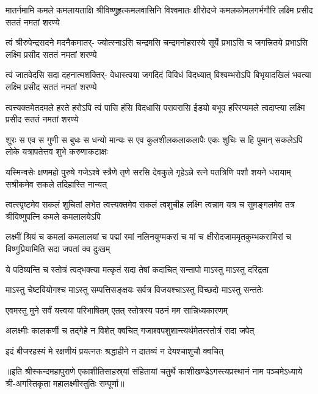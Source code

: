 


\fourlineindentedshloka
{मातर्नमामि कमले कमलायताक्षि}
{श्रीविष्णुहृत्कमलवासिनि विश्वमातः}
{क्षीरोदजे कमलकोमलगर्भगौरि}
{लक्ष्मि प्रसीद सततं नमतां शरण्ये}%

\fourlineindentedshloka
{त्वं श्रीरुपेन्द्रसदने मदनैकमातर्-}
{ज्योत्स्नाऽसि चन्द्रमसि चन्द्रमनोहरास्ये}
{सूर्ये प्रभाऽसि च जगत्त्रितये प्रभाऽसि}
{लक्ष्मि प्रसीद सततं नमतां शरण्ये}%


\fourlineindentedshloka
{त्वं जातवेदसि सदा दहनात्मशक्तिर्-}
{वेधास्त्वया जगदिदं विविधं विदध्यात्}
{विश्वम्भरोऽपि बिभृयादखिलं भवत्या}
{लक्ष्मि प्रसीद सततं नमतां शरण्ये}%

\fourlineindentedshloka
{त्वत्त्यक्तमेतदमले हरते हरोऽपि}
{त्वं पासि हंसि विदधासि परावरासि}
{ईड्यो बभूव हरिरप्यमले त्वदाप्त्या}
{लक्ष्मि प्रसीद सततं नमतां शरण्ये}%

\fourlineindentedshloka
{शूरः स एव स गुणी स बुधः स धन्यो}
{मान्यः स एव कुलशीलकलाकलापैः}
{एकः शुचिः स हि पुमान् सकलेऽपि लोके}
{यत्रापतेत्तव शुभे करुणाकटाक्षः}%

\fourlineindentedshloka
{यस्मिन्वसेः क्षणमहो पुरुषे गजेऽश्वे}
{स्त्रैणे तृणे सरसि देवकुले गृहेऽन्ने}
{रत्ने पतत्रिणि पशौ शयने धरायाम्}
{सश्रीकमेव सकले तदिहास्ति नान्यत्}%

\fourlineindentedshloka
{त्वत्स्पृष्टमेव सकलं शुचितां लभेत}
{त्वत्त्यक्तमेव सकलं त्वशुचीह लक्ष्मि}
{त्वन्नाम यत्र च सुमङ्गलमेव तत्र}
{श्रीविष्णुपत्नि कमले कमलालयेऽपि}%

\fourlineindentedshloka
{लक्ष्मीं श्रियं च कमलां कमलालयां च}
{पद्मां रमां नलिनयुग्मकरां च मां च}
{क्षीरोदजाममृतकुम्भकरामिरां च}
{विष्णुप्रियामिति सदा जपतां क्व दुःखम्}%

\twolineshloka
{ये पठिष्यन्ति च स्तोत्रं त्वद्भक्त्या मत्कृतं सदा}
{तेषां कदाचित् सन्तापो माऽस्तु माऽस्तु दरिद्रता}%

\twolineshloka
{माऽस्तु चेष्टवियोगश्च माऽस्तु सम्पत्तिसङ्क्षयः}
{सर्वत्र विजयश्चाऽस्तु विच्छदो माऽस्तु सन्ततेः}%


\twolineshloka
{एवमस्तु मुने सर्वं यत्त्वया परिभाषितम्}
{एतत् स्तोत्रस्य पठनं मम सान्निध्यकारणम्}%

\twolineshloka
{अलक्ष्मीः कालकर्णी च तद्गेहे न विशेत् क्वचित्}
{गजाश्वपशुशान्त्यर्थमेतत्स्तोत्रं सदा जपेत्}%

\twolineshloka
{इदं बीजरहस्यं मे रक्षणीयं प्रयत्नतः}
{श्रद्धाहीने न दातव्यं न देयश्चाशुचौ क्वचित्}%

॥इति श्रीस्कन्दमहापुराणे एकाशीतिसाहस्र्यां संहितायां चतुर्थे काशीखण्डेऽगस्त्यप्रस्थानं नाम पञ्चमेऽध्याये श्री-अगस्तिकृता महालक्ष्मीस्तुतिः सम्पूर्णा॥

